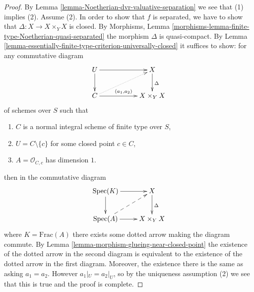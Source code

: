 \documentclass{stacks-project}
\theoremstyle{plain}
\theoremstyle{definition}
\theoremstyle{remark}
\numberwithin{equation}{subsection}
\def\Spec{\mathop{\mathrm{Spec}}}
\begin{document}
\begin{proof}
By Lemma \ref{lemma-Noetherian-dvr-valuative-separation} we see that
(1) implies (2). Assume (2). In order to show that $f$ is separated,
we have to show that $\Delta : X \to X \times_Y X$ is closed. By
Morphisms, Lemma \ref{morphisms-lemma-finite-type-Noetherian-quasi-separated}
the morphism $\Delta$ is quasi-compact.
By Lemma \ref{lemma-essentially-finite-type-criterion-universally-closed}
it suffices to show: for any commutative diagram
$$
\xymatrix{
U \ar[rr] \ar[d] & & X \ar[d]^\Delta \\
C \ar[rr]^{(a_1, a_2)} \ar@{..>}[rru] & & X \times_Y X
}
$$
of schemes over $S$ such that
\begin{enumerate}
\item $C$ is a normal integral scheme of finite type over $S$,
\item $U = C \setminus \{c\}$ for some closed point $c \in C$,
\item $A = \mathcal{O}_{C, c}$ has dimension $1$.
\end{enumerate}
then in the commutative diagram
$$
\xymatrix{
\Spec(K) \ar[r] \ar[d] & X \ar[d]^\Delta \\
\Spec(A) \ar[r] \ar@{-->}[ru] & X \times_Y X
}
$$
where $K = \text{Frac}(A)$ there exists some dotted arrow
making the diagram commute. By
Lemma \ref{lemma-morphism-glueing-near-closed-point}
the existence of the dotted arrow in the second diagram
is equivalent to the existence of the dotted arrow
in the first diagram. Moreover, the existence there
is the same as asking $a_1 = a_2$. However $a_1|_U = a_2|_U$, so
by the uniqueness assumption (2) we see that this is true
and the proof is complete.
\end{proof}
\end{document}
